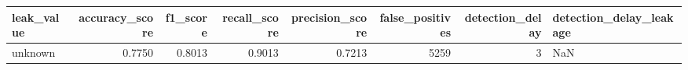 \begin{tabular}{lrrrrrrl}
\toprule
leak\_value & accuracy\_score & f1\_score & recall\_score & precision\_score & false\_positives & detection\_delay & detection\_delay\_leakage \\
\midrule
unknown & 0.7750 & 0.8013 & 0.9013 & 0.7213 & 5259 & 3 & NaN \\
\bottomrule
\end{tabular}
